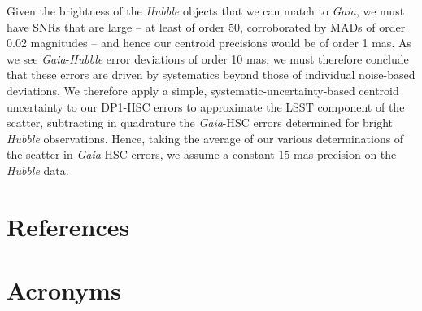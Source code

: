 \documentclass[SE,lsstdraft,authoryear,toc]{lsstdoc}
\begin{document}
Given the brightness of the \textit{Hubble} objects that we can match to \textit{Gaia}, we must have SNRs that are large -- at least of order 50, corroborated by MADs of order 0.02 magnitudes -- and hence our centroid precisions would be of order 1 mas.
As we see \textit{Gaia}-\textit{Hubble} error deviations of order 10 mas, we must therefore conclude that these errors are driven by systematics beyond those of individual noise-based deviations.
We therefore apply a simple, systematic-uncertainty-based centroid uncertainty to our DP1-HSC errors to approximate the LSST component of the scatter, subtracting in quadrature the \textit{Gaia}-HSC errors determined for bright \textit{Hubble} observations.
Hence, taking the average of our various determinations of the scatter in \textit{Gaia}-HSC errors, we assume a constant 15 mas precision on the \textit{Hubble} data.


\section{References} \label{sec:bib}
\renewcommand{\refname}{} %


\section{Acronyms} \label{sec:acronyms}

\end{document}

